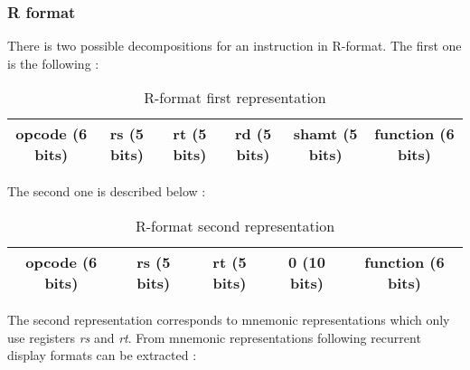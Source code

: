 \subsubsection*{R format}

	There is two possible decompositions for an instruction in R-format. The first one is the following : 
	
	\begin{table}[H]
	\centering
		\begin{tabular}{|c|c|c|c|c|c|}
			\hline 
	opcode (6 bits) & rs (5 bits) & rt (5 bits) & rd (5 bits) & shamt (5 bits) & function (6 bits) \\ 
			\hline 
		\end{tabular} 
		\caption{R-format first representation}
	\end{table}
	
	The second one is described below :
	\begin{table}[H]
		\centering
		\begin{tabular}{|c|c|c|c|c|}
			\hline 
	opcode (6 bits) & rs (5 bits) & rt (5 bits) & 0 (10 bits) & function (6 bits) \\ 
			\hline 
		\end{tabular} 
		\caption{R-format second representation}
	\end{table}
	
	The second representation corresponds to mnemonic representations which only use registers \textit{rs} and \textit{rt}. From mnemonic representations following recurrent display formats can be extracted :
	
